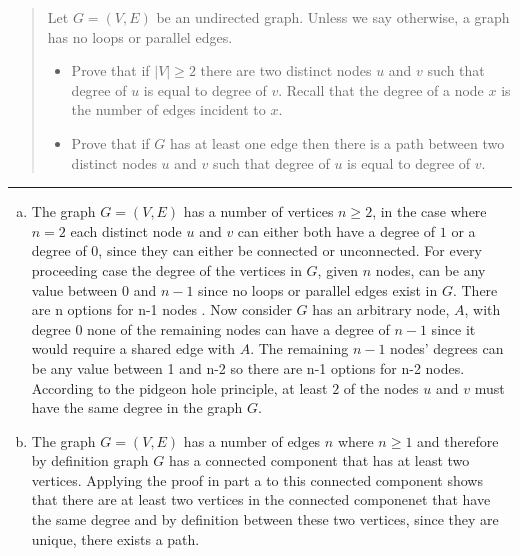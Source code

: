 \documentclass[11pt]{article}
\begin{document}



\begin{quote}
\item 
Let $G=(V,E)$ be an undirected graph. Unless we say otherwise, a graph has no loops or parallel edges.

\begin{itemize}
\item Prove that if $|V| \ge 2$ there are two distinct nodes $u$ and $v$ such that degree of $u$ is equal to degree of $v$.  Recall that the degree of a node $x$ is the number of edges incident to $x$.
\item Prove that if $G$ has at least one edge then there is a path between two distinct nodes $u$ and $v$ such that degree of $u$ is equal to degree of $v$.
\end{itemize}

\end{quote}
\hrule



\begin{solution}
\item 
\begin{enumerate}[(a)]
\item The graph $G = (V,E)$ has a number of vertices $n \ge 2$, in the case where $n=2$ each distinct node $u$ and $v$ can either both have a degree of $1$ or a degree of $0$, since they can either be connected or unconnected. For every proceeding case the degree of the vertices in $G$, given $n$ nodes, can be any value between $0$ and $n-1$ since no loops or parallel edges exist in $G$. There are n options for n-1 nodes . Now consider $G$  has an arbitrary node, $A$, with degree $0$ none of the remaining nodes can have a degree of $n-1$ since it would require a shared edge with $A$. The remaining $n-1$ nodes' degrees can  be any value between 1 and n-2 so there are n-1 options for n-2 nodes. According to the pidgeon hole principle, at least $2$ of the nodes $u$ and $v$ must have the same degree in the graph $G$.
\item The graph $G = (V,E)$ has a number of edges $n$ where $n \ge 1$ and therefore by definition graph $G$ has a connected component that has at least two vertices. Applying the proof in part a to this connected component shows that there are at least two vertices in the connected componenet that have the same degree and by definition between these two vertices, since they are unique, there exists a path. 
\end{enumerate}
\end{solution}
\end{document}
